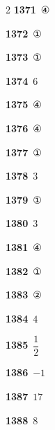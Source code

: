 \documentclass[10pt,a4paper]{article}
\begin{document}
\begin{multicols}{2}
\noindent\textbf{1371}\ ④\par
\noindent\textbf{1372}\ ①\par
\noindent\textbf{1373}\ ①\par
\noindent\textbf{1374}\ $6$\par
\noindent\textbf{1375}\ ④\par
\noindent\textbf{1376}\ ④\par
\noindent\textbf{1377}\ ①\par
\noindent\textbf{1378}\ $3$\par
\noindent\textbf{1379}\ ①\par
\noindent\textbf{1380}\ $3$\par
\noindent\textbf{1381}\ ④\par
\noindent\textbf{1382}\ ①\par
\noindent\textbf{1383}\ ②\par
\noindent\textbf{1384}\ $4$\par
\noindent\textbf{1385}\ $\dfrac{1}{2}$\par
\noindent\textbf{1386}\ $-1$\par
\noindent\textbf{1387}\ $17$\par
\noindent\textbf{1388}\ $8$\par
\end{multicols}
\end{document}

